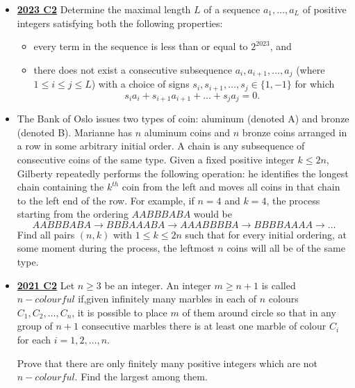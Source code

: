 \documentclass[11pt]{scrartcl}
\begin{document}
\begin{itemize}[leftmargin=*]
Determine all even cool numbers.
\item \href{https://artofproblemsolving.com/community/c6h3359755p31218537}{\textbf{2023 C2}} Determine the maximal length $L$ of a sequence $a_1,\dots,a_L$ of positive integers satisfying both the following properties:
\begin{itemize}[leftmargin=*]
\item[$\bullet$] every term in the sequence is less than or equal to $2^{2023}$, and
\item[$\bullet$] there does not exist a consecutive subsequence $a_i,a_{i+1},\dots,a_j$ (where $1\leqslant i\leqslant j\leqslant L$) with a choice of signs $s_i,s_{i+1},\dots,s_j\in\{1,-1\}$ for which\[s_ia_i+s_{i+1}a_{i+1}+\dots+s_ja_j=0.\]
\end{itemize}
    \item {} The Bank of Oslo issues two types of coin: aluminum (denoted A) and bronze (denoted B). Marianne has $n$ aluminum coins and $n$ bronze coins arranged in a row in some arbitrary initial order. A chain is any subsequence of consecutive coins of the same type. Given a fixed positive integer $k \leqslant 2n$, Gilberty repeatedly performs the following operation: he identifies the longest chain containing the $k^{th}$ coin from the left and moves all coins in that chain to the left end of the row. For example, if $n=4$ and $k=4$, the process starting from the ordering $AABBBABA$ would be \[AABBBABA \to BBBAAABA \to AAABBBBA \to BBBBAAAA \to \dots\] 
    Find all pairs $(n,k)$ with $1 \leqslant k \leqslant 2n$ such that for every initial ordering, at some moment during the process, the leftmost $n$ coins will all be of the same type.
    \item \href{https://artofproblemsolving.com/community/c6h2882538p25627501}{\textbf{2021 C2}}  Let $n\geqslant 3$ be an integer. An integer $m\geqslant n+1$ is called $n-colourful$ if,given infinitely many marbles in each of $n$ colours $C_1,C_2,\dots,C_n$, it is possible to place $m$ of them around circle so that in any group of $n+1$ consecutive marbles there is at least one marble of colour $C_i$ for each $i=1,2,\dots,n$.

    Prove that there are only finitely many positive integers which are not $n-colourful$. Find the largest among them.
    

\end{itemize}
\end{document}
